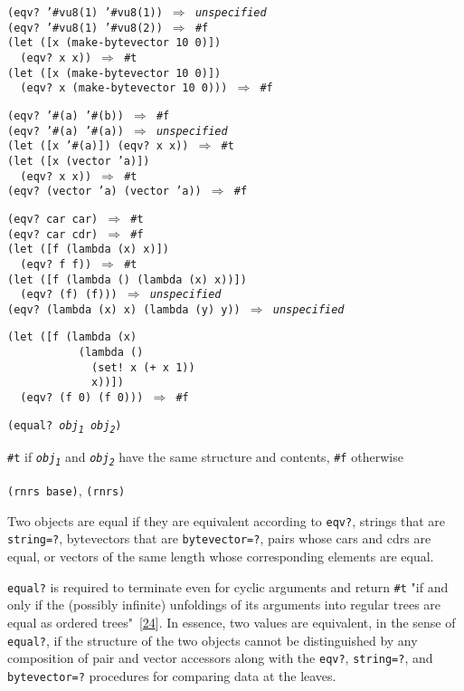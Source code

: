 \begin{alltt}
(eqv? '\#{}vu8(1) '\#{}vu8(1)) \(\Rightarrow\) \textit{unspecified}
(eqv? '\#{}vu8(1) '\#{}vu8(2)) \(\Rightarrow\) \#{}f
(let ([x (make-bytevector 10 0)])
  (eqv? x x)) \(\Rightarrow\) \#{}t
(let ([x (make-bytevector 10 0)])
  (eqv? x (make-bytevector 10 0))) \(\Rightarrow\) \#{}f

(eqv? '\#{}(a) '\#{}(b)) \(\Rightarrow\) \#{}f
(eqv? '\#{}(a) '\#{}(a)) \(\Rightarrow\) \textit{unspecified}
(let ([x '\#{}(a)]) (eqv? x x)) \(\Rightarrow\) \#{}t
(let ([x (vector 'a)])
  (eqv? x x)) \(\Rightarrow\) \#{}t
(eqv? (vector 'a) (vector 'a)) \(\Rightarrow\) \#{}f

(eqv? car car) \(\Rightarrow\) \#{}t
(eqv? car cdr) \(\Rightarrow\) \#{}f
(let ([f (lambda (x) x)])
  (eqv? f f)) \(\Rightarrow\) \#{}t
(let ([f (lambda () (lambda (x) x))])
  (eqv? (f) (f))) \(\Rightarrow\) \textit{unspecified}
(eqv? (lambda (x) x) (lambda (y) y)) \(\Rightarrow\) \textit{unspecified}

(let ([f (lambda (x)
           (lambda ()
             (set! x (+ x 1))
             x))])
  (eqv? (f 0) (f 0))) \(\Rightarrow\) \#{}f
\end{alltt}

\begin{description}

\label{objects_s13}\item[procedure] \texttt{(equal? \textit{obj\textsubscript{1}} \textit{obj\textsubscript{2}})}



\item[returns] \texttt{\#{}t} if \texttt{\textit{obj\textsubscript{1}}} and \texttt{\textit{obj\textsubscript{2}}} have the same
structure and contents, \texttt{\#{}f} otherwise


\item[libraries] \texttt{(rnrs base)}, \texttt{(rnrs)}
\end{description}


Two objects are equal if they are equivalent according to \texttt{eqv?},
strings that are \texttt{string=?}, bytevectors that are \texttt{bytevector=?},
pairs whose cars and cdrs are equal, or
vectors of the same length whose corresponding elements are equal.

\texttt{equal?} is required to terminate even for cyclic arguments and
return \texttt{\#{}t} "if and only if the (possibly infinite) unfoldings of
its arguments into regular trees are equal as ordered trees" [\hyperref[bibliography_g242]{24}].
In essence, two values are equivalent, in the sense of \texttt{equal?},
if the structure of the two objects cannot be distinguished by any
composition of pair and vector accessors along with the
\texttt{eqv?}, \texttt{string=?}, and \texttt{bytevector=?} procedures for
comparing data at the leaves.

